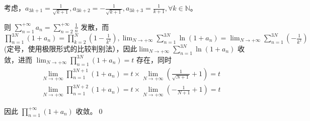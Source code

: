 考虑，$\displaystyle a_{3k+1} =\frac{1}{\sqrt{k+1}} ,a_{3k+2} =-\frac{1}{\sqrt{k+1}} ,a_{3k+3} =\frac{1}{k+1} ,\forall k\in \mathbb{N}$。

则 $\displaystyle \sum _{n=1}^{+\infty } a_{n} =\sum _{n=2}^{+\infty }\frac{1}{n}$ 发散，而 $\displaystyle \prod _{n=1}^{3N}( 1+a_{n}) =\prod _{k=2}^{N}\left( 1-\frac{1}{k^{2}}\right) ,\lim _{N\rightarrow +\infty }\sum _{n=1}^{3N}\ln( 1+a_{n}) =\lim _{N\rightarrow +\infty }\sum _{n=1}^{3N}\left( -\frac{1}{k^{2}}\right)$(定号，使用极限形式的比较判别法），因此$\displaystyle \lim _{N\rightarrow +\infty }\sum _{n=1}^{3N}\ln( 1+a_{n})$ 收敛，进而 $\displaystyle \lim _{N\rightarrow +\infty }\prod _{n=1}^{3N}( 1+a_{n}) =t$ 存在，$ $同时
\begin{gather*}
	\lim _{N\rightarrow +\infty }\prod _{n=1}^{3N+1}( 1+a_{n}) =t\times \lim _{N\rightarrow +\infty }\left(\frac{1}{\sqrt{N+1}} +1\right) =t\\
	\lim _{N\rightarrow +\infty }\prod _{n=1}^{3N+2}( 1+a_{n}) =t\times \lim _{N\rightarrow +\infty }\left( -\frac{1}{N+1} +1\right) =t
\end{gather*}


因此 $\displaystyle \prod _{n=1}^{+\infty }( 1+a_{n})$ 收敛。\qed 

\ifx\allfiles\undefined

\fi
